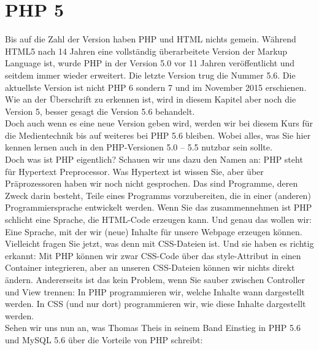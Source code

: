 \section{PHP 5}

Bis auf die Zahl der Version haben PHP und HTML nichts gemein. Während HTML5 nach 14 Jahren eine vollständig überarbeitete Version der Markup Language ist, wurde PHP in der Version 5.0 vor 11 Jahren veröffentlicht und seitdem immer wieder erweitert. Die letzte Version trug die Nummer 5.6. Die aktuellste Version ist nicht PHP 6 sondern 7 und im November 2015 erschienen.\\

Wie an der Überschrift zu erkennen ist, wird in diesem Kapitel aber noch die Version 5, besser gesagt die Version 5.6 behandelt.\\

Doch auch wenn es eine neue Version geben wird, werden wir bei diesem Kurs für die Medientechnik bis auf weiteres bei PHP 5.6 bleiben. Wobei alles, was Sie hier kennen lernen auch in den PHP-Versionen 5.0 – 5.5 nutzbar sein sollte.\\


Doch was ist PHP eigentlich? Schauen wir uns dazu den Namen an: PHP steht für Hypertext Preprocessor. Was Hypertext ist wissen Sie, aber über Präprozessoren haben wir noch nicht gesprochen. Das sind Programme, deren Zweck darin besteht, Teile eines Programms vorzubereiten, die in einer (anderen) Programmiersprache entwickelt werden. Wenn Sie das zusammennehmen ist PHP schlicht eine Sprache, die HTML-Code erzeugen kann. Und genau das wollen wir: Eine Sprache, mit der wir (neue) Inhalte für unsere Webpage erzeugen können.\\


Vielleicht fragen Sie jetzt, was denn mit CSS-Dateien ist. Und sie haben es richtig erkannt: Mit PHP können wir zwar CSS-Code über das style-Attribut in einen Container integrieren, aber an unseren CSS-Dateien können wir nichts direkt ändern. Andererseits ist das kein Problem, wenn Sie sauber zwischen Controller und View trennen: In PHP programmieren wir, welche Inhalte wann dargestellt werden. In CSS (und nur dort) programmieren wir, wie diese Inhalte dargestellt werden.\\


Sehen wir uns nun an, was Thomas Theis in seinem Band \glqq{}Einstieg in PHP 5.6 und MySQL 5.6\grqq{} über die Vorteile von PHP schreibt:


